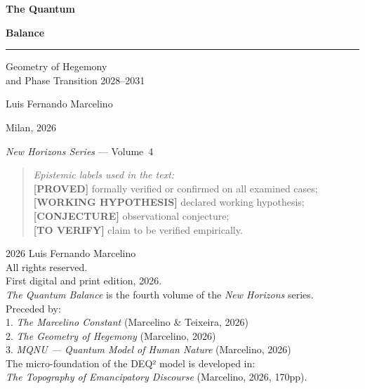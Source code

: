\documentclass[12pt, twoside]{book}
\theoremstyle{plain}
\theoremstyle{definition}
\theoremstyle{remark}
\newcommand{\Proved}{\textnormal{\textbf{[PROVED]}}}
\newcommand{\Hypoth}{\textnormal{\textbf{[WORKING HYPOTHESIS]}}}
\newcommand{\Conj}{\textnormal{\textbf{[CONJECTURE]}}}
\newcommand{\ToVerify}{\textnormal{\textbf{[TO VERIFY]}}}
\begin{document}
\begin{titlepage}
  \centering\vspace*{1.5cm}
  {\Huge\bfseries The Quantum\par}
  \vspace{0.2cm}
  {\Huge\bfseries Balance\par}
  \vspace{0.8cm}
  \rule{0.8\linewidth}{0.5pt}
  \vspace{0.6cm}

  {\large Geometry of Hegemony\\[0.3cm]
   and Phase Transition 2028--2031\par}
  \vspace{2cm}
  {\large Luis Fernando Marcelino\par}
  \vspace{0.5cm}
  {\normalsize Milan, 2026\par}
  \vfill
  {\small\textit{New Horizons Series} --- Volume~4\par}
  \vspace{0.5cm}
  \begin{small}\begin{quote}
    \textit{Epistemic labels used in the text:}\\[2pt]
    \Proved{} formally verified or confirmed on all examined cases;\\
    \Hypoth{} declared working hypothesis;\\
    \Conj{} observational conjecture;\\
    \ToVerify{} claim to be verified empirically.
  \end{quote}\end{small}
\end{titlepage}

\thispagestyle{empty}
\vspace*{\fill}
\begin{small}
\noindent \textcopyright{} 2026 Luis Fernando Marcelino\\[4pt]
All rights reserved.\\[4pt]
First digital and print edition, 2026.\\[4pt]
\textit{The Quantum Balance} is the fourth volume of the \textit{New Horizons} series.\\[4pt]
Preceded by:\\
1. \textit{The Marcelino Constant} (Marcelino \& Teixeira, 2026)\\
2. \textit{The Geometry of Hegemony} (Marcelino, 2026)\\
3. \textit{MQNU --- Quantum Model of Human Nature} (Marcelino, 2026)\\[4pt]
The micro-foundation of the DEQ² model is developed in:\\
\textit{The Topography of Emancipatory Discourse} (Marcelino, 2026, 170pp).
\end{small}
\vspace*{\fill}
\clearpage
\end{document}
